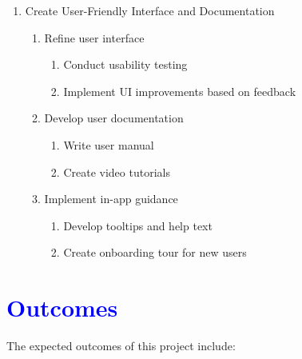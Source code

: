 \documentclass[12pt]{article}
\newcommand{\tb}{\textcolor{blue}}
\begin{document}
\begin{enumerate}
    \item Create User-Friendly Interface and Documentation
    \begin{enumerate}
        \item Refine user interface
        \begin{enumerate}
            \item Conduct usability testing
            \item Implement UI improvements based on feedback
        \end{enumerate}
        \item Develop user documentation
        \begin{enumerate}
            \item Write user manual
            \item Create video tutorials
        \end{enumerate}
        \item Implement in-app guidance
        \begin{enumerate}
            \item Develop tooltips and help text
            \item Create onboarding tour for new users
        \end{enumerate}
    \end{enumerate}
\end{enumerate}


\section{\tb{Outcomes}}
The expected outcomes of this project include:
\end{document}
